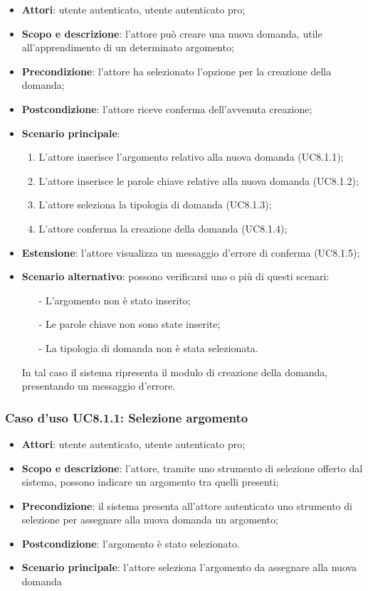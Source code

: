 	\begin{itemize}
		\item
			\textbf{Attori}: utente autenticato, utente autenticato pro;
		\item		
			\textbf{Scopo e descrizione}: l'attore può creare una nuova domanda, utile all'apprendimento di un determinato argomento;
		\item
			\textbf{Precondizione}: l'attore ha selezionato l'opzione per la creazione della domanda;
		\item
			\textbf{Postcondizione}: l'attore riceve conferma dell'avvenuta creazione;		
		\item
			\textbf{Scenario principale}:
	       		\begin{enumerate}
					\item
					L'attore inserisce l'argomento relativo alla nuova domanda (UC8.1.1);
					\item
					L'attore inserisce le parole chiave relative alla nuova domanda (UC8.1.2);
					\item
					L'attore seleziona la tipologia di domanda (UC8.1.3);
					\item
					L'attore conferma la creazione della domanda (UC8.1.4);
	 			\end{enumerate}
	 	\item
			\textbf{Estensione}: l'attore visualizza un messaggio d'errore di conferma (UC8.1.5);
	 	\item
	 		\textbf{Scenario alternativo}: possono verificarsi uno o più di questi scenari:
				\begin{itemize}
					\item[-] 	
						L'argomento non è stato inserito;
					\item[-] 
						Le parole chiave non sono state inserite;
					\item[-]
						La tipologia di domanda non è stata selezionata.	
				\end{itemize}
			In tal caso il sistema ripresenta il modulo di creazione della domanda, presentando un messaggio d'errore.
	\end{itemize}
	\subsubsection{Caso d'uso UC8.1.1: Selezione argomento}
	\begin{itemize}
		\item
			\textbf{Attori}: utente autenticato, utente autenticato pro;
		\item
			\textbf{Scopo e descrizione}: l'attore, tramite uno strumento di selezione offerto dal sistema, possono indicare un argomento tra quelli presenti;
		\item		
			\textbf{Precondizione}: il sistema presenta all'attore autenticato uno strumento di selezione per assegnare alla nuova domanda un argomento;
		\item
			\textbf{Postcondizione}: l'argomento è stato selezionato.
		\item
			\textbf{Scenario principale}: l'attore seleziona l'argomento da assegnare alla nuova domanda	
				
	\end{itemize}	
